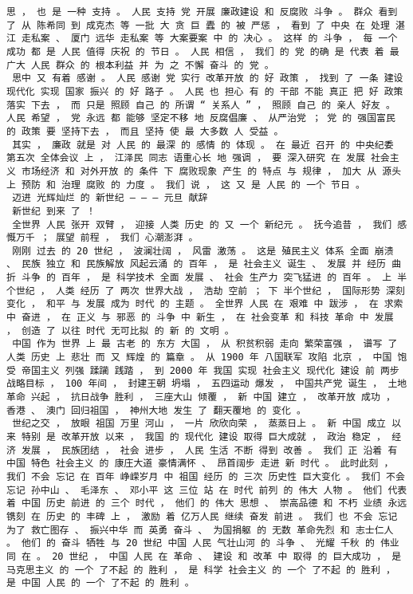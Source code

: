 \documentclass{article}
\begin{document}
\begin{Verbatim}[commandchars=\\\{\}]
 思 ， 也 是 一种 支持 。 人民 支持 党 开展 廉政建设 和 反腐败 斗争 。 群众 看到 了 从 陈希同 到 成克杰 等 一批 大 贪 巨 蠹 的 被 严惩 ， 看到 了 中央 在 处理 湛江 走私案 、 厦门 远华 走私案 等 大案要案 中 的 决心 。 这样 的 斗争 ， 每 一个 成功 都 是 人民 值得 庆祝 的 节日 。 人民 相信 ， 我们 的 党 的确 是 代表 着 最 广大 人民 群众 的 根本利益 并 为 之 不懈 奋斗 的 党 。 
 思中 又 有着 感谢 。 人民 感谢 党 实行 改革开放 的 好 政策 ， 找到 了 一条 建设 现代化 实现 国家 振兴 的 好 路子 。 人民 也 担心 有 的 干部 不能 真正 把 好 政策 落实 下去 ， 而 只是 照顾 自己 的 所谓 “ 关系人 ” ， 照顾 自己 的 亲人 好友 。 人民 希望 ， 党 永远 都 能够 坚定不移 地 反腐倡廉 、 从严治党 ； 党 的 强国富民 的 政策 要 坚持下去 ， 而且 坚持 使 最 大多数 人 受益 。 
 其实 ， 廉政 就是 对 人民 的 最深 的 感情 的 体现 。 在 最近 召开 的 中央纪委 第五次 全体会议 上 ， 江泽民 同志 语重心长 地 强调 ， 要 深入研究 在 发展 社会主义 市场经济 和 对外开放 的 条件 下 腐败现象 产生 的 特点 与 规律 ， 加大 从 源头 上 预防 和 治理 腐败 的 力度 。 我们 说 ， 这 又 是 人民 的 一个 节日 。 
 迈进 光辉灿烂 的 新世纪 — — — 元旦 献辞 
 新世纪 到来 了 ！ 
 全世界 人民 张开 双臂 ， 迎接 人类 历史 的 又 一个 新纪元 。 抚今追昔 ， 我们 感慨万千 ； 展望 前程 ， 我们 心潮澎湃 。 
 刚刚 过去 的 20 世纪 ， 波澜壮阔 ， 风雷 激荡 。 这是 殖民主义 体系 全面 崩溃 、 民族 独立 和 民族解放 风起云涌 的 百年 ， 是 社会主义 诞生 、 发展 并 经历 曲折 斗争 的 百年 ， 是 科学技术 全面 发展 、 社会 生产力 突飞猛进 的 百年 。 上 半个世纪 ， 人类 经历 了 两次 世界大战 ， 浩劫 空前 ； 下 半个世纪 ， 国际形势 深刻 变化 ， 和平 与 发展 成为 时代 的 主题 。 全世界 人民 在 艰难 中 跋涉 ， 在 求索 中 奋进 ， 在 正义 与 邪恶 的 斗争 中 新生 ， 在 社会变革 和 科技 革命 中 发展 ， 创造 了 以往 时代 无可比拟 的 新 的 文明 。 
 中国 作为 世界 上 最 古老 的 东方 大国 ， 从 积贫积弱 走向 繁荣富强 ， 谱写 了 人类 历史 上 悲壮 而 又 辉煌 的 篇章 。 从 1900 年 八国联军 攻陷 北京 ， 中国 饱受 帝国主义 列强 蹂躏 践踏 ， 到 2000 年 我国 实现 社会主义 现代化 建设 前 两步 战略目标 ， 100 年间 ， 封建王朝 坍塌 ， 五四运动 爆发 ， 中国共产党 诞生 ， 土地革命 兴起 ， 抗日战争 胜利 ， 三座大山 倾覆 ， 新 中国 建立 ， 改革开放 成功 ， 香港 、 澳门 回归祖国 ， 神州大地 发生 了 翻天覆地 的 变化 。 
 世纪之交 ， 放眼 祖国 万里 河山 ， 一片 欣欣向荣 ， 蒸蒸日上 。 新 中国 成立 以来 特别 是 改革开放 以来 ， 我国 的 现代化 建设 取得 巨大成就 ， 政治 稳定 ， 经济 发展 ， 民族团结 ， 社会 进步 ， 人民 生活 不断 得到 改善 。 我们 正 沿着 有 中国 特色 社会主义 的 康庄大道 豪情满怀 、 昂首阔步 走进 新 时代 。 此时此刻 ， 我们 不会 忘记 在 百年 峥嵘岁月 中 祖国 经历 的 三次 历史性 巨大变化 。 我们 不会 忘记 孙中山 、 毛泽东 、 邓小平 这 三位 站 在 时代 前列 的 伟大 人物 。 他们 代表 着 中国 历史 前进 的 三个 时代 ， 他们 的 伟大 思想 、 崇高品德 和 不朽 业绩 永远 镌刻 在 历史 的 丰碑 上 ， 激励 着 亿万人民 继续 奋发 前进 。 我们 也 不会 忘记 为了 救亡图存 、 振兴中华 而 英勇 奋斗 、 为国捐躯 的 无数 革命先烈 和 志士仁人 。 他们 的 奋斗 牺牲 与 20 世纪 中国 人民 气壮山河 的 斗争 、 光耀 千秋 的 伟业 同 在 。 20 世纪 ， 中国 人民 在 革命 、 建设 和 改革 中 取得 的 巨大成功 ， 是 马克思主义 的 一个 了不起 的 胜利 ， 是 科学 社会主义 的 一个 了不起 的 胜利 ， 是 中国 人民 的 一个 了不起 的 胜利 。 

\end{Verbatim}
\end{document}
